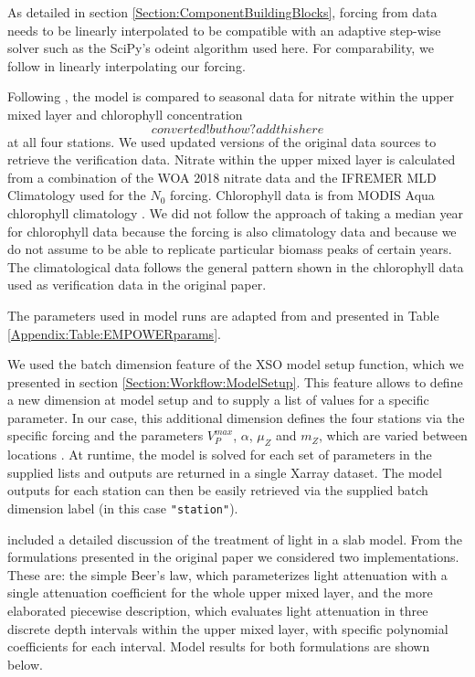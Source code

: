 \documentclass[journal abbreviation, manuscript]{copernicus}
\begin{document}
As detailed in section \ref{Section:ComponentBuildingBlocks}, forcing from data needs to be linearly interpolated to be compatible with an adaptive step-wise solver such as the SciPy's odeint algorithm used here. For comparability, we follow \citet{Anderson2015c} in linearly interpolating our forcing.

Following \citet{Anderson2015c}, the model is compared to seasonal data for nitrate within the upper mixed layer and chlorophyll concentration $$converted! but how? add this here$$ at all four stations. We used updated versions of the original data sources to retrieve the verification data. Nitrate within the upper mixed layer is calculated from a combination of the WOA 2018 nitrate data and the IFREMER MLD Climatology used for the $N_0$ forcing. Chlorophyll data is from MODIS Aqua chlorophyll climatology \citep{NASAGoddardSpaceFlightCenterOceanEcologyLaboratoryOceanBiologyProcessingGroup}. We did not follow the approach of taking a median year for chlorophyll data because the forcing is also climatology data and because we do not assume to be able to replicate particular biomass peaks of certain years. The climatological data follows the general pattern shown in the chlorophyll data used as verification data in the original paper.


The parameters used in model runs are adapted from \citet{Anderson2015c} and presented in Table \ref{Appendix:Table:EMPOWERparams}.

We used the batch dimension feature of the XSO model setup function, which we presented in section \ref{Section:Workflow:ModelSetup}. This feature allows to define a new dimension at model setup and to supply a list of values for a specific parameter. In our case, this additional dimension defines the four stations via the specific forcing and the parameters $V_P^{max}$, $\alpha$, $\mu_Z$ and $m_Z$, which are varied between locations \citep{Anderson2015c}. At runtime, the model is solved for each set of parameters in the supplied lists and outputs are returned in a single Xarray dataset. The model outputs for each station can then be easily retrieved via the supplied batch dimension label (in this case \texttt{"station"}).

\citet{Anderson2015c} included a detailed discussion of the treatment of light in a slab model. From the formulations presented in the original paper we considered two implementations. These are: the simple Beer's law, which parameterizes light attenuation with a single attenuation coefficient for the whole upper mixed layer, and the more elaborated piecewise description, which evaluates light attenuation in three discrete depth intervals within the upper mixed layer, with specific polynomial coefficients for each interval. Model results for both formulations are shown below.
\end{document}
